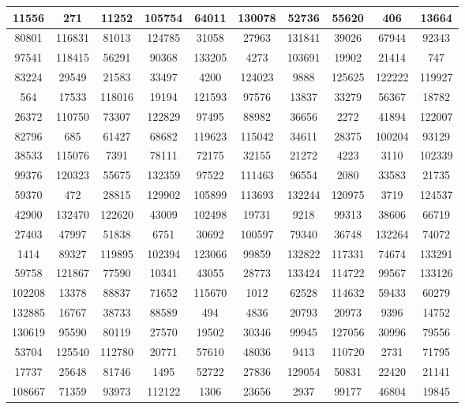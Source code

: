 \documentclass[12pt]{article}
\begin{document}
\begin{appendices}
\begin{table}[H]
\begin{tabular}{|c|c|c|c|c|c|c|c|c|c|}
		11556	& 271	& 11252	& 105754	& 64011	& 130078	& 52736	& 55620	& 406	& 13664	\\ \hline
		80801	& 116831	& 81013	& 124785	& 31058	& 27963	& 131841	& 39026	& 67944	& 92343	\\ \hline
		97541	& 118415	& 56291	& 90368	& 133205	& 4273	& 103691	& 19902	& 21414	& 747	\\ \hline
		83224	& 29549	& 21583	& 33497	& 4200	& 124023	& 9888	& 125625	& 122222	& 119927	\\ \hline
		564	& 17533	& 118016	& 19194	& 121593	& 97576	& 13837	& 33279	& 56367	& 18782	\\ \hline
		26372	& 110750	& 73307	& 122829	& 97495	& 88982	& 36656	& 2272	& 41894	& 122007	\\ \hline
		82796	& 685	& 61427	& 68682	& 119623	& 115042	& 34611	& 28375	& 100204	& 93129	\\ \hline
		38533	& 115076	& 7391	& 78111	& 72175	& 32155	& 21272	& 4223	& 3110	& 102339	\\ \hline
		99376	& 120323	& 55675	& 132359	& 97522	& 111463	& 96554	& 2080	& 33583	& 21735	\\ \hline
		59370	& 472	& 28815	& 129902	& 105899	& 113693	& 132244	& 120975	& 3719	& 124537	\\ \hline
		42900	& 132470	& 122620	& 43009	& 102498	& 19731	& 9218	& 99313	& 38606	& 66719	\\ \hline
		27403	& 47997	& 51838	& 6751	& 30692	& 100597	& 79340	& 36748	& 132264	& 74072	\\ \hline
		1414	& 89327	& 119895	& 102394	& 123066	& 99859	& 132822	& 117331	& 74674	& 133291	\\ \hline
		59758	& 121867	& 77590	& 10341	& 43055	& 28773	& 133424	& 114722	& 99567	& 133126	\\ \hline
		102208	& 13378	& 88837	& 71652	& 115670	& 1012	& 62528	& 114632	& 59433	& 60279	\\ \hline
		132885	& 16767	& 38733	& 88589	& 494	& 4836	& 20793	& 20973	& 9396	& 14752	\\ \hline
		130619	& 95590	& 80119	& 27570	& 19502	& 30346	& 99945	& 127056	& 30996	& 79556	\\ \hline
		53704	& 125540	& 112780	& 20771	& 57610	& 48036	& 9413	& 110720	& 2731	& 71795	\\ \hline
		17737	& 25648	& 81746	& 1495	& 52722	& 27836	& 129054	& 50831	& 22420	& 21141	\\ \hline
		108667	& 71359	& 93973	& 112122	& 1306	& 23656	& 2937	& 99177	& 46804	& 19845	\\ \hline

\end{tabular}
\end{table}
\end{appendices}
\end{document}
